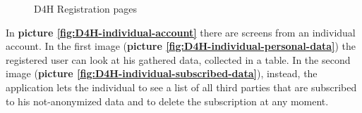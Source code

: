 \begin{figure}[H]
  \centering
  
  \caption{D4H Registration pages}
  \label{fig:D4H-registration}
\end{figure}

In \textbf{picture \ref{fig:D4H-individual-account}} there are screens from an individual account. In the first image (\textbf{picture \ref{fig:D4H-individual-personal-data}}) the registered user can look at his gathered data, collected in a table. In the second image (\textbf{picture \ref{fig:D4H-individual-subscribed-data}}), instead, the application lets the individual to see a list of all third parties that are subscribed to his not-anonymized data and to delete the subscription at any moment.

